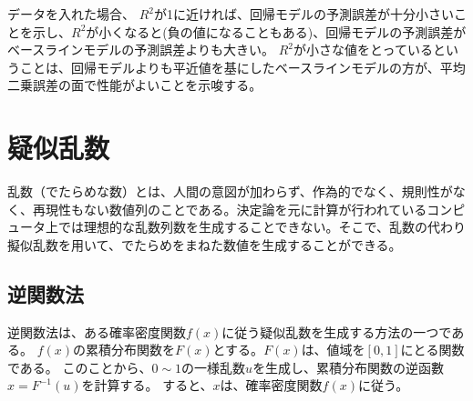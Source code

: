 データを入れた場合、
$R^2$が1に近ければ、回帰モデルの予測誤差が十分小さいことを示し、$R^2$が小くなると(負の値になることもある)、回帰モデルの予測誤差がベースラインモデルの予測誤差よりも大きい。
$R^2$が小さな値をとっているということは、回帰モデルよりも平近値を基にしたベースラインモデルの方が、平均二乗誤差の面で性能がよいことを示唆する。


\section{疑似乱数}
乱数（でたらめな数）とは、人間の意図が加わらず、作為的でなく、規則性がなく、再現性もない数値列のことである。決定論を元に計算が行われているコンピュータ上では理想的な乱数列数を生成することできない。そこで、乱数の代わり擬似乱数を用いて、でたらめをまねた数値を生成することができる。

\subsection{逆関数法}
逆関数法は、ある確率密度関数$f(x)$に従う疑似乱数を生成する方法の一つである。
$f(x)$の累積分布関数を$F(x)$とする。$F(x)$は、値域を$[0,1]$にとる関数である。
このことから、$0\sim 1$の一様乱数$u$を生成し、累積分布関数の逆函數$x=F^{-1}(u)$を計算する。
すると、$x$は、確率密度関数$f(x)$に従う。

